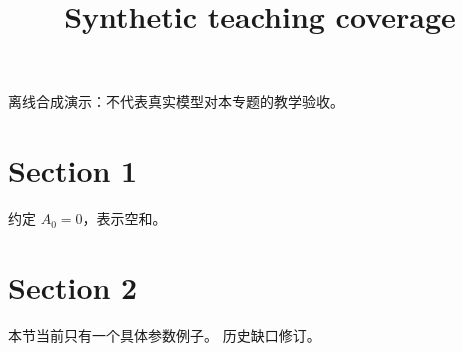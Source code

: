 \documentclass[UTF8,fontset=fandol,11pt]{ctexart}
\title{Synthetic teaching coverage}
\date{}
\begin{document}
\maketitle
\par\noindent 离线合成演示：不代表真实模型对本专题的教学验收。\par
\section{Section 1}\label{sec:S01}
约定 $A_0=0$，表示空和。\par
\section{Section 2}\label{sec:S02}
本节当前只有一个具体参数例子。 历史缺口修订。\par
\end{document}
